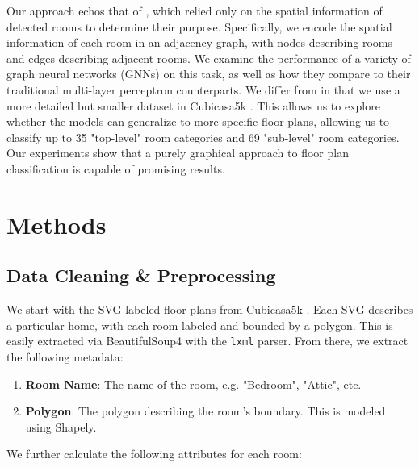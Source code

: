 \documentclass{article}
\begin{document}
Our approach echos that of \citet{floorgraphs2021}, which relied only on the spatial information of detected rooms to determine their purpose. Specifically, we encode the spatial information of each room in an adjacency graph, with nodes describing rooms and edges describing adjacent rooms. We examine the performance of a variety of graph neural networks (GNNs) on this task, as well as how they compare to their traditional multi-layer perceptron counterparts. We differ from \citet{floorgraphs2021} in that we use a more detailed but smaller dataset in Cubicasa5k \cite{cubicasa5k}. This allows us to explore whether the models can generalize to more specific floor plans, allowing us to classify up to 35 "top-level" room categories and 69 "sub-level" room categories. Our experiments show that a purely graphical approach to floor plan classification is capable of promising results.

\section{Methods}

\subsection{Data Cleaning \& Preprocessing}
We start with the SVG-labeled floor plans from Cubicasa5k \cite{cubicasa5k}. Each SVG describes a particular home, with each room labeled and bounded by a polygon. This is easily extracted via BeautifulSoup4 with the \verb|lxml| parser. From there, we extract the following metadata:

\begin{enumerate}
    \item \textbf{Room Name}: The name of the room, e.g. "Bedroom", "Attic", etc.
    \item \textbf{Polygon}: The polygon describing the room's boundary. This is modeled using Shapely.
\end{enumerate}

We further calculate the following attributes for each room:
\end{document}
